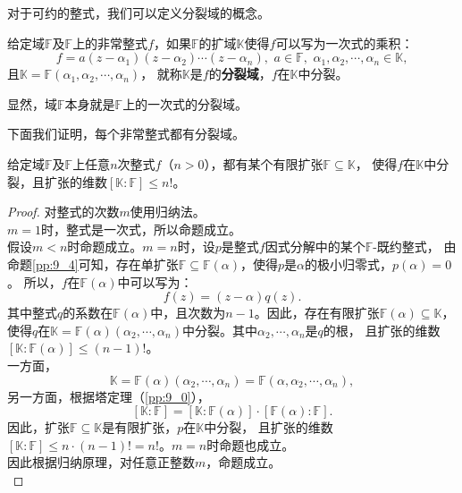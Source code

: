 \documentclass[12pt,UTF8,fontset=none]{ctexbook}
\begin{document}
\begin{appendix}
对于可约的整式，我们可以定义分裂域的概念。
\begin{df}\label{df:9_2}
    给定域$\mathbb{F}$及$\mathbb{F}$上的非常整式$f$，如果$\mathbb{F}$的扩域$\mathbb{K}$使得$f$可以写为一次式的乘积：
    $$ f = a(z - \alpha_1)(z - \alpha_2)\cdots(z - \alpha_n), \,\, a \in \mathbb{F}, \,\, \alpha_1, \alpha_2, \cdots ,  \alpha_n \in \mathbb{K}, $$
    且$\mathbb{K} = \mathbb{F}(\alpha_1, \alpha_2, \cdots , \alpha_n)$，
    就称$\mathbb{K}$是$f$的\textbf{分裂域}，$f$在$\mathbb{K}$中分裂。
\end{df}

显然，域$\mathbb{F}$本身就是$\mathbb{F}$上的一次式的分裂域。

下面我们证明，每个非常整式都有分裂域。
\begin{tm}\label{tm:9_5}
    给定域$\mathbb{F}$及$\mathbb{F}$上任意$n$次整式$f$（$n > 0$），都有某个有限扩张$\mathbb{F} \subseteq \mathbb{K}$，
    使得$f$在$\mathbb{K}$中分裂，且扩张的维数$[\mathbb{K} : \mathbb{F}] \leqslant n!$。
\end{tm}
\begin{proof} %
    对整式的次数$m$使用归纳法。\\
    $m = 1$时，整式是一次式，所以命题成立。\\
    假设$m < n$时命题成立。$m = n$时，设$p$是整式$f$因式分解中的某个$\mathbb{F}$-既约整式，
    由命题\ref{pp:9_4}可知，存在单扩张$\mathbb{F} \subseteq \mathbb{F}(\alpha)$，使得$p$是$\alpha$的极小归零式，$p(\alpha) = 0$。
    所以，$f$在$\mathbb{F}(\alpha)$中可以写为：
    $$ f(z) = (z - \alpha) q(z).$$
    其中整式$q$的系数在$\mathbb{F}(\alpha)$中，且次数为$n-1$。因此，存在有限扩张$\mathbb{F}(\alpha) \subseteq \mathbb{K}$，
    使得$q$在$\mathbb{K} = \mathbb{F}(\alpha)(\alpha_2, \cdots , \alpha_n)$中分裂。其中$\alpha_2, \cdots , \alpha_n$是$q$的根，
    且扩张的维数$[\mathbb{K} : \mathbb{F}(\alpha)] \leqslant (n - 1)!$。\\
    一方面，
    $$\mathbb{K} = \mathbb{F}(\alpha)(\alpha_2, \cdots , \alpha_n) = \mathbb{F}(\alpha, \alpha_2, \cdots , \alpha_n),$$
    另一方面，根据塔定理（\ref{pp:9_0}），
    $$[\mathbb{K} : \mathbb{F}] = [\mathbb{K} : \mathbb{F}(\alpha)]\cdot [\mathbb{F}(\alpha) : \mathbb{F}]. $$
    因此，扩张$\mathbb{F} \subseteq \mathbb{K}$是有限扩张，$p$在$\mathbb{K}$中分裂，
    且扩张的维数$[\mathbb{K} : \mathbb{F}] \leqslant n \cdot (n - 1)! = n!$。$m = n$时命题也成立。\\
    因此根据归纳原理，对任意正整数$m$，命题成立。\\
\end{proof}


\end{appendix}
\end{document}
